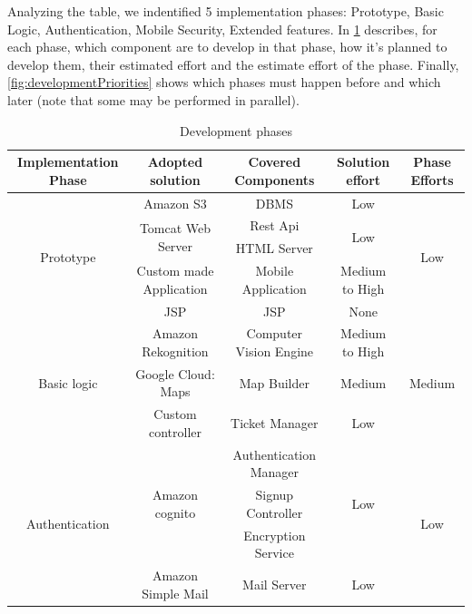 \documentclass{article}
\begin{document}
Analyzing the table, we indentified 5 implementation phases: Prototype, Basic Logic, Authentication, Mobile Security, Extended features. In \cref{tab:developPhases} describes, for each phase, which component are to develop in that phase, how it's planned to develop them, their estimated effort and the estimate effort of the phase. Finally, \cref{fig:developmentPriorities} shows which phases must happen before and which later (note that some may be performed in parallel).
\begin{table}[h]
\begin{center}
\caption{Development phases}
\label{tab:developPhases}
\small
\centering
\begin{tabular}{|c|c|c|c|c|}
		\hline
		\textbf{Implementation Phase}		&\textbf{Adopted solution}					&\textbf{Covered Components}		&\textbf{Solution effort}	&\textbf{Phase Efforts}\\
		\hline
		\multirow{5}{*}{Prototype}			&Amazon S3									&DBMS							&Low				&\multirow{5}{*}{Low}			\\
											\cline{2-4}
											&\multirow{2}{*}{Tomcat Web Server}			&Rest Api						&\multirow{2}{*}{Low}&							\\
											&											&HTML Server						&				&								\\
											\cline{2-4}
											&Custom made Application						&Mobile Application				&Medium to High	&								\\
											\cline{2-4}
											&JSP											&JSP								&None			&								\\
		\hline
		\multirow{3}{*}{Basic logic}			&Amazon Rekognition							&Computer Vision Engine			&Medium to High	&\multirow{3}{*}{Medium}			\\
											\cline{2-4}
											&Google Cloud: Maps							&Map Builder						&Medium			&								\\
											\cline{2-4}
											&Custom controller							&Ticket Manager					&Low				&								\\
		\hline		
		\multirow{4}{*}{Authentication}		&\multirow{3}{*}{Amazon cognito}				&Authentication Manager			&\multirow{3}{*}{Low}&\multirow{4}{*}{Low}		\\
											&											&Signup Controller				&				&								\\
											&											&Encryption Service				&				&								\\
											\cline{2-4}
											&Amazon Simple Mail							&Mail Server						&Low				&								\\

\end{tabular}
\end{center}
\end{table}
\end{document}
